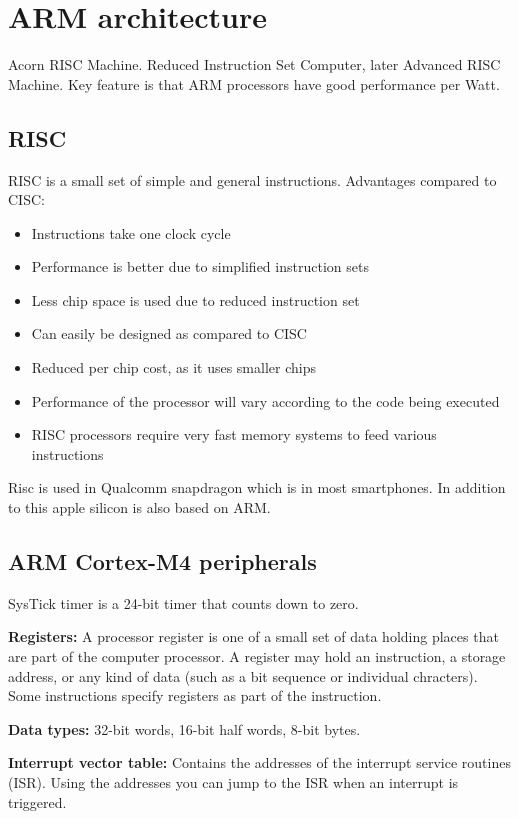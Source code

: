 \section{ARM architecture}

Acorn RISC Machine. Reduced Instruction Set Computer, later Advanced RISC Machine.
Key feature is that ARM processors have good performance per Watt.



\subsection{RISC}

RISC is a small set of simple and general instructions.
Advantages compared to CISC:
\begin{itemize}
	\item Instructions take one clock cycle
	\item Performance is better due to simplified instruction sets
	\item Less chip space is used due to reduced instruction set
	\item Can easily be designed as compared to CISC
	\item Reduced per chip cost, as it uses smaller chips
\end{itemize}

\begin{itemize}
	\item Performance of the processor will vary according to the code being executed
	\item RISC processors require very fast memory systems to feed various instructions
\end{itemize}

Risc is used in Qualcomm snapdragon which is in most smartphones.
In addition to this apple silicon is also based on ARM.


\subsection{ARM Cortex-M4 peripherals}

SysTick timer is a 24-bit timer that counts down to zero.


\textbf{Registers:} A processor register is one of a small set of data holding places
that are part of the computer processor. A register may hold an instruction,
a storage address, or any kind of data (such as a bit sequence or individual chracters).
Some  instructions specify registers as part of the instruction.

\textbf{Data types:} 32-bit words, 16-bit half words, 8-bit bytes.

\textbf{Interrupt vector table:} Contains the addresses of the interrupt service routines (ISR).
Using the addresses you can jump to the ISR when an interrupt is triggered.
